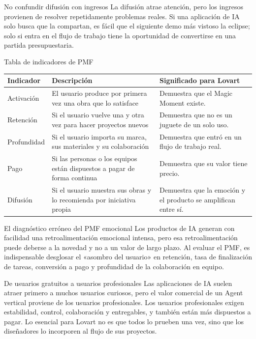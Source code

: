 \documentclass[a4paper]{article}
\begin{document}
\begin{warningbox}{No confundir difusión con ingresos}
La difusión atrae atención, pero los ingresos provienen de resolver repetidamente problemas reales. Si una aplicación de IA solo busca que la compartan, es fácil que el siguiente demo más vistoso la eclipse; solo si entra en el flujo de trabajo tiene la oportunidad de convertirse en una partida presupuestaria.
\end{warningbox}

\begin{knowledgebox}{Tabla de indicadores de PMF}
\begin{tabularx}{\textwidth}{p{}p{}X}
\toprule
Indicador & Descripción & Significado para Lovart \\
\midrule
Activación & El usuario produce por primera vez una obra que lo satisface & Demuestra que el Magic Moment existe. \\
Retención & Si el usuario vuelve una y otra vez para hacer proyectos nuevos & Demuestra que no es un juguete de un solo uso. \\
Profundidad & Si el usuario importa su marca, sus materiales y su colaboración & Demuestra que entró en un flujo de trabajo real. \\
Pago & Si las personas o los equipos están dispuestos a pagar de forma continua & Demuestra que su valor tiene precio. \\
Difusión & Si el usuario muestra sus obras y lo recomienda por iniciativa propia & Demuestra que la emoción y el producto se amplifican entre sí. \\
\bottomrule
\end{tabularx}
\end{knowledgebox}

\begin{warningbox}{El diagnóstico erróneo del PMF emocional}
Los productos de IA generan con facilidad una retroalimentación emocional intensa, pero esa retroalimentación puede deberse a la novedad y no a un valor de largo plazo. Al evaluar el PMF, es indispensable desglosar el «asombro del usuario» en retención, tasa de finalización de tareas, conversión a pago y profundidad de la colaboración en equipo.
\end{warningbox}

\begin{knowledgebox}{De usuarios gratuitos a usuarios profesionales}
Las aplicaciones de IA suelen atraer primero a muchos usuarios curiosos, pero el valor comercial de un Agent vertical proviene de los usuarios profesionales. Los usuarios profesionales exigen estabilidad, control, colaboración y entregables, y también están más dispuestos a pagar. Lo esencial para Lovart no es que todos lo prueben una vez, sino que los diseñadores lo incorporen al flujo de sus proyectos.
\end{knowledgebox}
\end{document}
